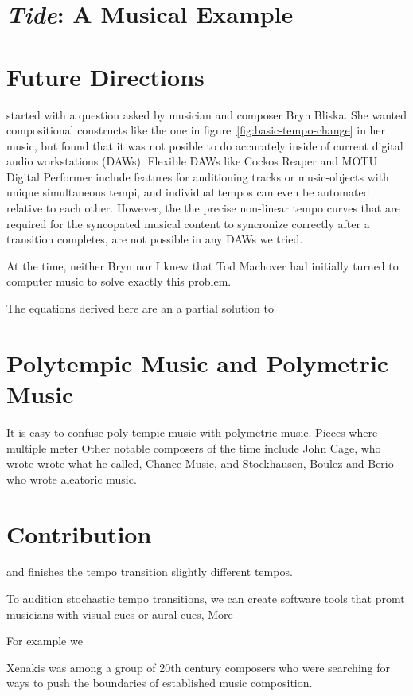 \section{\textit{Tide}: A Musical Example}
\label{sec:polytempic-implementation}

\section{Future Directions}
\label{sec:polytempic-future-directions}
\polytempic started with a question asked by musician and composer
Bryn Bliska. She wanted compositional constructs like the one in
figure~\ref{fig:basic-tempo-change} in her music, but found that it
was not posible to do accurately inside of current digital audio
workstations (DAWs). Flexible DAWs like Cockos Reaper and MOTU Digital
Performer include features for auditioning tracks or music-objects
with unique simultaneous tempi, and individual tempos can even be
automated relative to each other. However, the the precise non-linear
tempo curves that are required for the syncopated musical content to
syncronize correctly after a transition completes, are not possible in
any DAWs we tried. 

At the time, neither Bryn nor I knew that Tod Machover had initially
turned to computer music to solve exactly this problem. 

The equations derived here are an a partial solution to 

\section{Polytempic Music and Polymetric Music}
\label{sec:polytempic-vs-polymetric}
It is easy to confuse poly tempic music with polymetric music.  Pieces
where multiple meter
Other notable composers
of the time include John Cage, who wrote wrote what he called, Chance
Music, and Stockhausen, Boulez and Berio who wrote aleatoric music.


\section{Contribution}
\label{sec:polytempic-contribution}

and finishes the tempo transition slightly different tempos.

To audition stochastic tempo transitions, we can create software tools
that promt musicians with visual cues or aural cues, 
More 

For example we 

Xenakis was among a group of
20th century composers who were searching for ways to push the
boundaries of established music composition.


